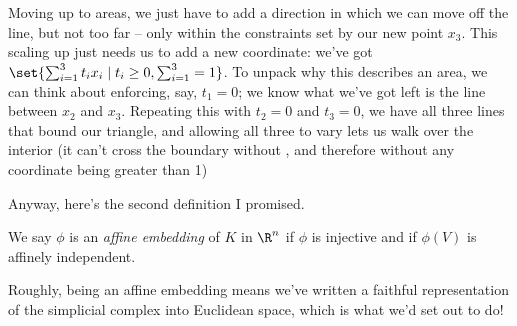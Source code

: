 \documentclass{lec}
\begin{document}
    Moving up to areas, we just have to add a direction in which we can move off the line, but not too far -- only within the constraints set by our new point $x_3$. This scaling up just needs us to add a new coordinate: we've got $\set{\sum_{i=1}^3 t_i x_i \mid t_i \geq 0, \sum_{i=1}^3 = 1}$. To unpack why this describes an area, we can think about enforcing, say, $t_1 = 0$; we know what we've got left is the line between $x_2$ and $x_3$. Repeating this with $t_2 = 0$ and $t_3 = 0$, we have all three lines that bound our triangle, and allowing all three to vary lets us walk over the interior (it can't cross the boundary without , and therefore without any coordinate being greater than 1)


    Anyway, here's the second definition I promised.

    \begin{definition}
        We say $\phi$ is an \textit{affine embedding} of $K$ in $\R^n$ if $\phi$ is injective and if $\phi(V)$ is affinely independent.
    \end{definition}

    Roughly, being an affine embedding means we've written a faithful representation of the simplicial complex into Euclidean space, which is what we'd set out to do!
\end{document}
